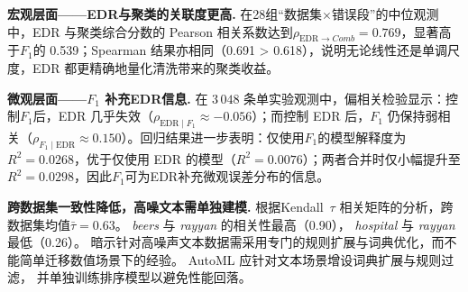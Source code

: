 \documentclass[10pt]{article} %
\numberwithin{equation}{section}
\begin{document}
\medskip
\noindent
\textbf{宏观层面——EDR与聚类的关联度更高.}\;
在28组“数据集$\times$错误段”的中位观测中，EDR 与聚类综合分数的 Pearson 相关系数达到\(\rho_ {\text{EDR}\!\to\!Comb}=0.769\)，显著高于$F_{1}$的 0.539；Spearman 结果亦相同（0.691 > 0.618），说明无论线性还是单调尺度，EDR 都更精确地量化清洗带来的聚类收益。

\medskip
\noindent
\textbf{微观层面——$F_{1}$ 补充EDR信息.}\;
在 $3\,048$ 条单实验观测中，偏相关检验显示：控制$F_{1}$后，EDR 几乎失效（$\rho_{\text{EDR}\mid F_{1}}\approx-0.056$）；而控制 EDR 后，$F_{1}$ 仍保持弱相关（$\rho_{F_{1}\mid\text{EDR}}\approx0.150$）。回归结果进一步表明：仅使用$F_{1}$的模型解释度为 $R^{2}=0.0268$，优于仅使用 EDR 的模型（$R^{2}=0.0076$）；两者合并时仅小幅提升至 $R^{2}=0.0298$，因此$F_{1}$可为EDR补充微观误差分布的信息。


\medskip
\noindent
\textbf{跨数据集一致性降低，高噪文本需单独建模.}\;
根据Kendall $\tau$ 相关矩阵的分析，跨数据集均值$\bar{\tau}=0.63$。%
\textit{beers} 与 \textit{rayyan} 的相关性最高（0.90），%
\textit{hospital} 与 \textit{rayyan} 最低（0.26）。%
暗示针对高噪声文本数据需采用专门的规则扩展与词典优化，而不能简单迁移数值场景下的经验。
AutoML 应针对文本场景增设词典扩展与规则过滤，
并单独训练排序模型以避免性能回落。
\end{document}
